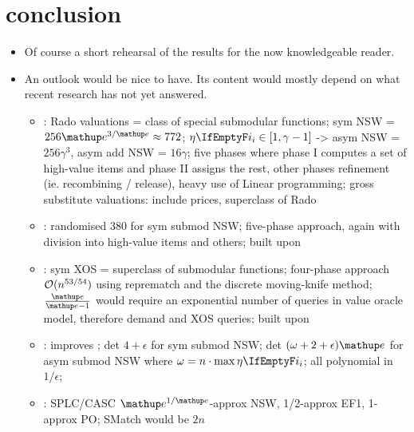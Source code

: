\section{conclusion}
\label{sec:conclusion}

\begin{itemize}
	\item
	Of course a short rehearsal of the results for the now knowledgeable reader.

	\item
	An outlook would be nice to have.
	Its content would mostly depend on what recent research has not yet answered.
	\begin{itemize}
		\item
		\cite{approximating_nsw_under_rado_valuations}:
		Rado valuations = class of special submodular functions;
		sym NSW = \(256\euler^{3/\euler} \approx 772\);
		\(\weight \in [1, \gamma-1]\) -> asym NSW = \(256\gamma^{3}\), asym add NSW = \(16 \gamma\);
		five phases where phase I computes a set of high-value items and phase II assigns the rest, other phases refinement (ie. recombining / release), heavy use of Linear programming;
		gross substitute valuations: include prices, superclass of Rado

		\item
		\cite{a_constfactor_approx_algo_for_nsw_with_submod_valuations}:
		randomised 380 for sym submod NSW;
		five-phase approach, again with division into high-value items and others;
		built upon \cite{approximating_nsw_under_rado_valuations}

		\item
		\cite{sublin_approx_algo_for_nsw_with_xos_valuations}:
		sym XOS = superclass of submodular functions;
		four-phase approach \(\mathcal{O}(n^{53/54})\) using reprematch and the discrete moving-knife method;
		\(\frac{\euler}{\euler - 1}\) would require an exponential number of queries in value oracle model, therefore demand and XOS queries;
		built upon \cite{approximating_nsw_under_rado_valuations}

		\item
		\cite{approx_nsw_by_matching_and_local_search}:
		improves \cite{a_constfactor_approx_algo_for_nsw_with_submod_valuations};
		det \(4 + \epsilon\) for sym submod NSW;
		det \((\omega + 2 + \epsilon)\euler\) for asym submod NSW where \(\omega = n \cdot \max \weight\);
		all polynomial in \(1/\epsilon\);

		\item
		\cite{fair_division_of_indiv_goods_for_a_class_of_concave_valuations}:
		SPLC/CASC \(\euler^{1/\euler}\)-approx NSW, 1/2-approx EF1, 1-approx PO;
		SMatch would be \(2n\)


\end{itemize}
\end{itemize}
